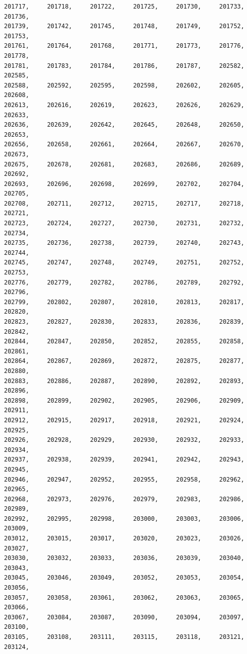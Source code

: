 \documentclass[a4paper,11pt]{report}
\begin{document}
\begin{verbatim}
201717,     201718,     201722,     201725,     201730,     201733,     201736,
201739,     201742,     201745,     201748,     201749,     201752,     201753,
201761,     201764,     201768,     201771,     201773,     201776,     201778,
201781,     201783,     201784,     201786,     201787,     202582,     202585,
202588,     202592,     202595,     202598,     202602,     202605,     202608,
202613,     202616,     202619,     202623,     202626,     202629,     202633,
202636,     202639,     202642,     202645,     202648,     202650,     202653,
202656,     202658,     202661,     202664,     202667,     202670,     202673,
202675,     202678,     202681,     202683,     202686,     202689,     202692,
202693,     202696,     202698,     202699,     202702,     202704,     202705,
202708,     202711,     202712,     202715,     202717,     202718,     202721,
202723,     202724,     202727,     202730,     202731,     202732,     202734,
202735,     202736,     202738,     202739,     202740,     202743,     202744,
202745,     202747,     202748,     202749,     202751,     202752,     202753,
202776,     202779,     202782,     202786,     202789,     202792,     202796,
202799,     202802,     202807,     202810,     202813,     202817,     202820,
202823,     202827,     202830,     202833,     202836,     202839,     202842,
202844,     202847,     202850,     202852,     202855,     202858,     202861,
202864,     202867,     202869,     202872,     202875,     202877,     202880,
202883,     202886,     202887,     202890,     202892,     202893,     202896,
202898,     202899,     202902,     202905,     202906,     202909,     202911,
202912,     202915,     202917,     202918,     202921,     202924,     202925,
202926,     202928,     202929,     202930,     202932,     202933,     202934,
202937,     202938,     202939,     202941,     202942,     202943,     202945,
202946,     202947,     202952,     202955,     202958,     202962,     202965,
202968,     202973,     202976,     202979,     202983,     202986,     202989,
202992,     202995,     202998,     203000,     203003,     203006,     203009,
203012,     203015,     203017,     203020,     203023,     203026,     203027,
203030,     203032,     203033,     203036,     203039,     203040,     203043,
203045,     203046,     203049,     203052,     203053,     203054,     203056,
203057,     203058,     203061,     203062,     203063,     203065,     203066,
203067,     203084,     203087,     203090,     203094,     203097,     203100,
203105,     203108,     203111,     203115,     203118,     203121,     203124,

\end{verbatim}
\end{document}
